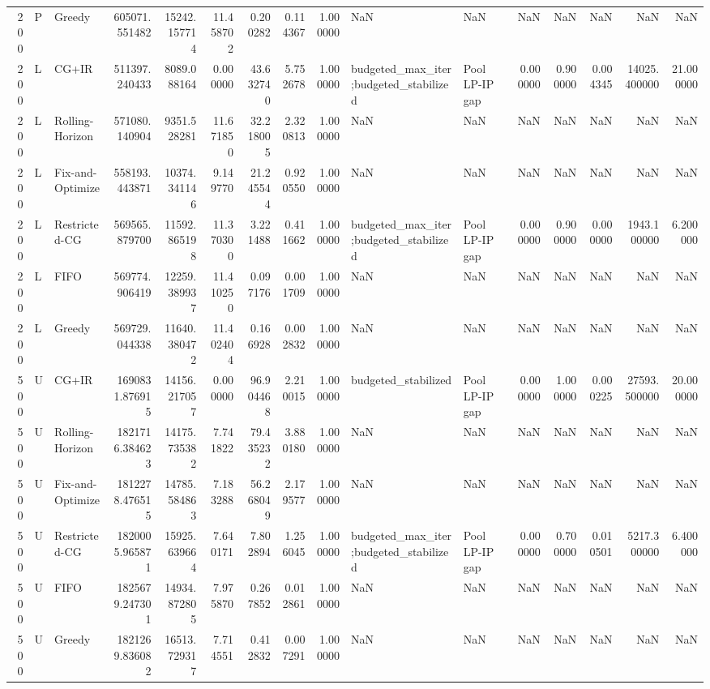\begin{tabular}{rllrrrrrrllrrrrr}
200 & P & Greedy & 605071.551482 & 15242.157714 & 11.458702 & 0.200282 & 0.114367 & 1.000000 & NaN & NaN & NaN & NaN & NaN & NaN & NaN \\
200 & L & CG+IR & 511397.240433 & 8089.088164 & 0.000000 & 43.632740 & 5.752678 & 1.000000 & budgeted_max_iter;budgeted_stabilized & Pool LP-IP gap & 0.000000 & 0.900000 & 0.004345 & 14025.400000 & 21.000000 \\
200 & L & Rolling-Horizon & 571080.140904 & 9351.528281 & 11.671850 & 32.218005 & 2.320813 & 1.000000 & NaN & NaN & NaN & NaN & NaN & NaN & NaN \\
200 & L & Fix-and-Optimize & 558193.443871 & 10374.341146 & 9.149770 & 21.245544 & 0.920550 & 1.000000 & NaN & NaN & NaN & NaN & NaN & NaN & NaN \\
200 & L & Restricted-CG & 569565.879700 & 11592.865198 & 11.370300 & 3.221488 & 0.411662 & 1.000000 & budgeted_max_iter;budgeted_stabilized & Pool LP-IP gap & 0.000000 & 0.900000 & 0.000000 & 1943.100000 & 6.200000 \\
200 & L & FIFO & 569774.906419 & 12259.389937 & 11.410250 & 0.097176 & 0.001709 & 1.000000 & NaN & NaN & NaN & NaN & NaN & NaN & NaN \\
200 & L & Greedy & 569729.044338 & 11640.380472 & 11.402404 & 0.166928 & 0.002832 & 1.000000 & NaN & NaN & NaN & NaN & NaN & NaN & NaN \\
500 & U & CG+IR & 1690831.876915 & 14156.217057 & 0.000000 & 96.904468 & 2.210015 & 1.000000 & budgeted_stabilized & Pool LP-IP gap & 0.000000 & 1.000000 & 0.000225 & 27593.500000 & 20.000000 \\
500 & U & Rolling-Horizon & 1821716.384623 & 14175.735382 & 7.741822 & 79.435232 & 3.880180 & 1.000000 & NaN & NaN & NaN & NaN & NaN & NaN & NaN \\
500 & U & Fix-and-Optimize & 1812278.476515 & 14785.584863 & 7.183288 & 56.268049 & 2.179577 & 1.000000 & NaN & NaN & NaN & NaN & NaN & NaN & NaN \\
500 & U & Restricted-CG & 1820005.965871 & 15925.639664 & 7.640171 & 7.802894 & 1.256045 & 1.000000 & budgeted_max_iter;budgeted_stabilized & Pool LP-IP gap & 0.000000 & 0.700000 & 0.010501 & 5217.300000 & 6.400000 \\
500 & U & FIFO & 1825679.247301 & 14934.872805 & 7.975870 & 0.267852 & 0.012861 & 1.000000 & NaN & NaN & NaN & NaN & NaN & NaN & NaN \\
500 & U & Greedy & 1821269.836082 & 16513.729317 & 7.714551 & 0.412832 & 0.007291 & 1.000000 & NaN & NaN & NaN & NaN & NaN & NaN & NaN \\
\bottomrule
\end{tabular}
